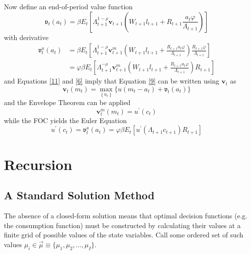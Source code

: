\documentclass[12pt]{article}
\theoremstyle{definition}
\begin{document}
Now define an end-of-period value function 
\begin{equation}
	\label{11}
	\boldsymbol{\mathfrak{v}}_t\left(a_t\right)=\beta E_t\left[\Lambda_{t+1}^{1-\rho} \mathbf{v}_{t+1}\left(W_{t+1} l_{t+1}+ R_{t+1} \frac{a_t \varphi }{\Lambda_{t+1}} \right)\right]
\end{equation}
with derivative
\begin{equation}
	\label{12}
	\begin{aligned}
		\boldsymbol{\mathfrak{v}}_t^a\left(a_t\right) & =\beta E_t\left[\Lambda_{t+1}^{1-\rho} \mathbf{v}_{t+1}^m\left(W_{t+1} l_{t+1}+\frac{R_{t+1} a_t \varphi }{\Lambda_{t+1}}\right) \frac{R_{t+1} \varphi }{\Lambda_{t+1}}\right] \\
		& =\varphi \beta E_t\left[\Lambda_{t+1}^{-\rho} \mathbf{v}_{t+1}^m\left(W_{t+1} l_{t+1}+\frac{R_{t+1} a_t \varphi }{\Lambda_{t+1}}\right) R_{t+1}\right] 
	\end{aligned}
\end{equation}
and Equations \ref{11} and \ref{6} imply that Equation \ref{9} can be written using $\mathbf{v}_t$ as
\begin{equation}
	\label{13} 
	\mathbf{v}_t\left(m_t\right)=\max _{\left\{a_t\right\}}\bigl\{u\left(m_t-a_t\right)+\boldsymbol{\mathfrak{v}}_t\left(a_t\right)\bigl\}
\end{equation}
and the Envelope Theorem can be applied
\begin{equation}
	\label{14}
	\mathbf{v}_t^m(m_t) = u^\prime(c_t)
\end{equation}
while the FOC yields the Euler Equation
\begin{equation}
	\label{15}
	u^{\prime}\left(c_t\right)=\boldsymbol{\mathfrak{v}}_t^a\left(a_t\right)=\varphi \beta E_t\left[u^{\prime}\left(\Lambda_{t+1} c_{t+1}\right) R_{t+1}\right]
\end{equation}

\section{Recursion}
\subsection{A Standard Solution Method}
The absence of a closed-form solution means that optimal decision functions (e.g. the consumption function) must be constructed by calculating their values at a finite grid of possible values of the state variables. Call some ordered set of such values $\mu_i \in \overrightarrow{\mu} \equiv \{\mu_1, \mu_2, \ldots, \mu_I\} $.
\end{document}
